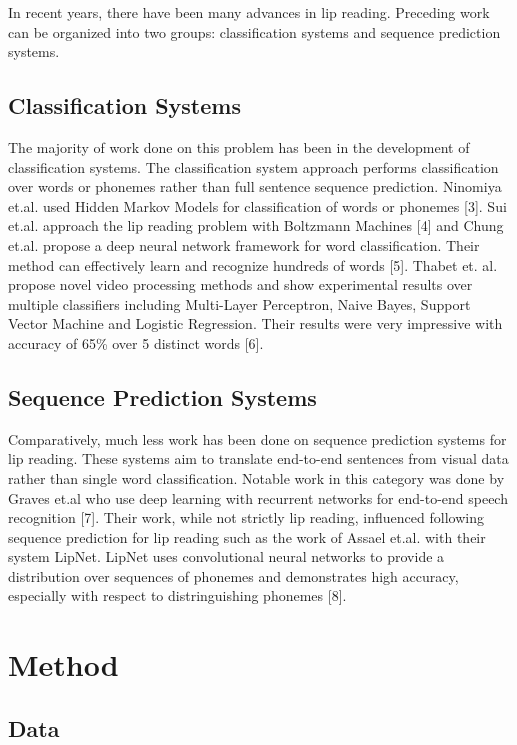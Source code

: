 \documentclass{article}
\begin{document}
In recent years, there have been many advances in lip reading. Preceding work can be organized into two groups: classification systems and sequence prediction systems. 

\subsection{Classification Systems}

The majority of work done on this problem has been in the development of classification systems. The classification system approach performs classification over words or phonemes rather than full sentence sequence prediction. Ninomiya et.al. used Hidden Markov Models for classification of words or phonemes [3]. Sui et.al. approach the lip reading problem with Boltzmann Machines [4] and Chung et.al. propose a deep neural network framework for word classification. Their method can effectively learn and recognize hundreds of words [5]. Thabet et. al. propose novel video processing methods and show experimental results over multiple classifiers including Multi-Layer Perceptron, Naive Bayes, Support Vector Machine and Logistic Regression. Their results were very impressive with accuracy of 65\% over 5 distinct words [6].

\subsection{Sequence Prediction Systems}

Comparatively, much less work has been done on sequence prediction systems for lip reading. These systems aim to translate end-to-end sentences from visual data rather than single word classification. Notable work in this category was done by Graves et.al who use deep learning with recurrent networks for end-to-end speech recognition [7]. Their work, while not strictly lip reading, influenced following sequence prediction for lip reading such as the work of Assael et.al. with their system LipNet. LipNet uses convolutional neural networks to provide a distribution over sequences of phonemes and demonstrates high accuracy, especially with respect to distringuishing phonemes [8].

\section{Method}

\subsection{Data}
\end{document}
